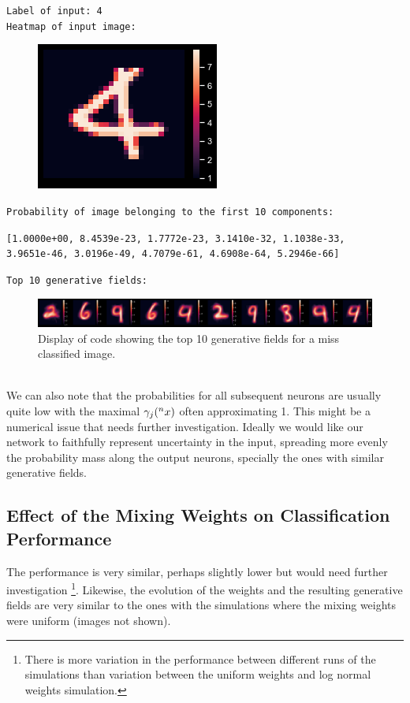 \documentclass{article}
\begin{document}
 
\texttt{Label of input:  4\\}
\texttt{Heatmap of input image:\\}
\begin{figure}[!h]
   \includegraphics[scale=0.3]{img/output_51_1.png}
\end{figure}
 
\texttt{Probability of image belonging to the first 10 components:}
 
\texttt{[1.0000e+00, 8.4539e-23, 1.7772e-23, 3.1410e-32, 1.1038e-33,\\
		3.9651e-46, 3.0196e-49, 4.7079e-61, 4.6908e-64, 5.2946e-66]}
 
\texttt{Top 10 generative fields:}
\begin{figure}[h]
   \includegraphics[width=\textwidth]{img/output_51_4.png}
   \caption{Display of code showing the top 10 generative fields for a miss classified image. \label{ts}}
\end{figure}\\
 
We can also note that the probabilities for all subsequent neurons are usually quite low with the maximal \(\gamma_j(\prescript{n}{}{x})\) often approximating 1. This might be a numerical issue that needs further investigation. Ideally we would like our network to faithfully represent uncertainty in the input, spreading more evenly the probability mass along the output neurons, specially the ones with similar generative fields.
 
\subsection{Effect of the Mixing Weights on Classification Performance}
The performance is very similar, perhaps slightly lower but would need further investigation \footnote{There is more variation in the performance between different runs of the simulations than variation between the uniform weights and log normal weights simulation.}. Likewise, the evolution of the weights and the resulting generative fields are very similar to the ones with the simulations where the mixing weights were uniform (images not shown).
 
\end{document}
